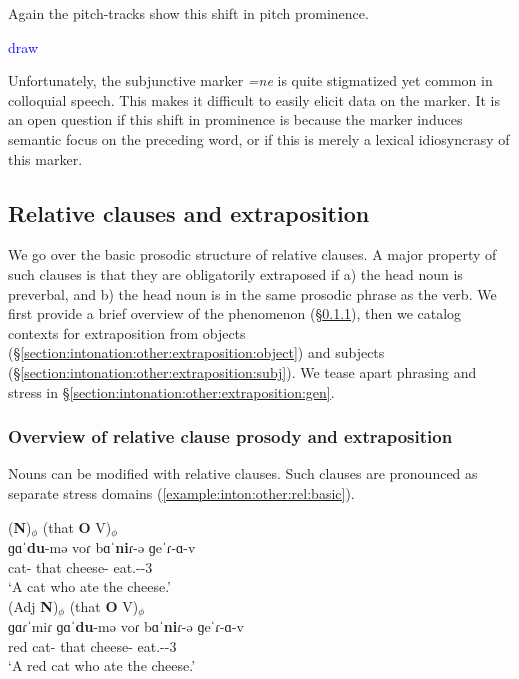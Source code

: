 Again the pitch-tracks show this shift in pitch prominence. 

\textcolor{blue}{draw}


Unfortunately, the subjunctive marker \textit{=ne} is quite stigmatized yet common in colloquial speech. This makes it difficult to easily elicit data on the marker.  It is an open question if this shift in prominence is because the marker induces semantic focus on the preceding word, or if this is merely a lexical idiosyncrasy of this marker. 


\subsection{Relative clauses and extraposition}\label{section:intonation:other:extraposition}

We go over the basic prosodic structure of relative clauses. A major property of such clauses is that they are obligatorily extraposed if a)   the head noun is preverbal, and b) the head noun is in the same prosodic phrase as the verb. We first provide a brief overview of the phenomenon (\S\ref{section:intonation:other:extraposition:overview}), then we catalog contexts for extraposition from objects (\S\ref{section:intonation:other:extraposition:object}) and subjects (\S\ref{section:intonation:other:extraposition:subj}). We tease apart phrasing and stress in  \S\ref{section:intonation:other:extraposition:gen}. 

\subsubsection{Overview of relative clause prosody and extraposition}\label{section:intonation:other:extraposition:overview}


Nouns can be modified with relative clauses. Such clauses are pronounced as separate stress domains (\ref{example:inton:other:rel:basic}).   

\begin{exe}
	\ex 	\label{example:inton:other:rel:basic} \begin{xlist}
		\ex 	\glll  ({{\textbf{N}})$_\phi$}  (that {\textbf{O}} V)$_\phi$ \\
		{{ɡɑˈ\textbf{du}-mə}}   voɾ {{bɑ\textbf{ˈni}ɾ-ə}} {ɡeˈɾ-ɑ-v} 
		\\
		cat-{\indf} that cheese-{} eat.{\aorperf}-{\pst}-3{\sg}
		\\
		\trans `A   cat who ate the cheese.'
		\\
		\ex 	\glll  (Adj {{\textbf{N}})$_\phi$}  (that {\textbf{O}} V)$_\phi$ \\
		{ɡɑɾˈmiɾ} {{ɡɑˈ\textbf{du}-mə}}  voɾ {{bɑ\textbf{ˈni}ɾ-ə}} {ɡeˈɾ-ɑ-v} 
		\\
		red cat-{\indf} that cheese-{} eat.{\aorperf}-{\pst}-3{\sg}
		\\
		\trans `A red cat who ate the cheese.'
		\\
	\end{xlist}
	
	
\end{exe}

